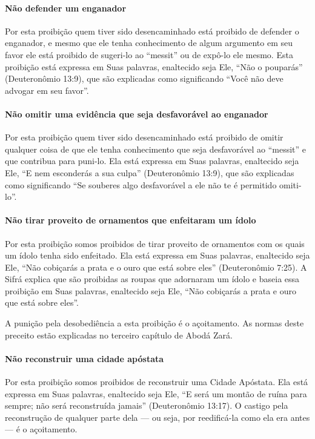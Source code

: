 \paragraph{Não defender um enganador}

Por esta proibição quem tiver sido desencaminhado está proibido de
defender o enganador, e mesmo que ele tenha conhecimento de algum
argumento em seu favor ele está proibido de sugeri-lo ao ``messit'' ou
de expô-lo ele mesmo. Esta proibição está expressa em Suas palavras,
enaltecido seja Ele, ``Não o pouparás'' (Deuteronômio 13:9), que são
explicadas como significando ``Você não deve advogar em seu favor''.

\paragraph{Não omitir uma evidência que seja desfavorável ao enganador}

Por esta proibição quem tiver sido desencaminhado está proibido de
omitir qualquer coisa de que ele tenha conhecimento que seja
desfavorável ao ``messit'' e que contribua para puni-lo. Ela está expressa em Suas
palavras, enaltecido seja Ele, ``E nem esconderás a sua culpa''
(Deuteronômio 13:9), que são explicadas como significando ``Se souberes
algo desfavorável a ele não te é permitido omiti-lo''.

\paragraph{Não tirar proveito de ornamentos que enfeitaram um ídolo}

Por esta proibição somos proibidos de tirar proveito de ornamentos com
os quais um ídolo tenha sido enfeitado. Ela está expressa em Suas
palavras, enaltecido seja Ele, ``Não cobiçarás a prata e o ouro que está
sobre eles'' (Deuteronômio 7:25). A Sifrá explica que são proibidas as
roupas que adornaram um ídolo e baseia essa proibição em Suas palavras,
enaltecido seja Ele, ``Não cobiçarás a prata e ouro que está sobre
eles''.

A punição pela desobediência a esta proibição é o açoitamento. As normas
deste preceito estão explicadas no terceiro capítulo de Abodá Zará.

\paragraph{Não reconstruir uma cidade apóstata}

Por esta proibição somos proibidos de reconstruir uma Cidade Apóstata.
Ela está expressa em Suas palavras, enaltecido seja Ele, ``E será um
montão de ruína para sempre; não será reconstruída jamais''
(Deuteronômio 13:17). O castigo pela reconstrução de qualquer parte dela
--- ou seja, por reedificá-la como ela era antes --- é o açoitamento.


